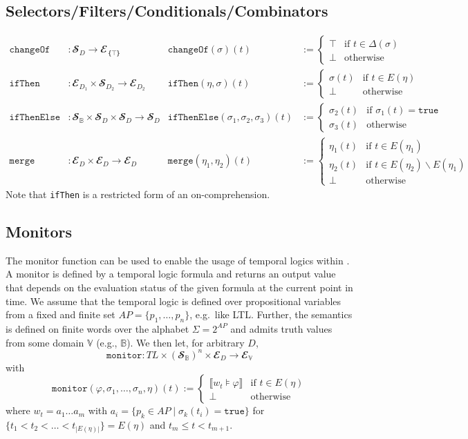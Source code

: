 \subsection{Selectors/Filters/Conditionals/Combinators}

\begin{align*}
  \mathtt{changeOf}&: 𝓢_{D} → 𝓔_{｛⊤｝}
      & \mathtt{changeOf}(σ)(t) &:= \begin{cases}
           ⊤ & \text{if } t∈Δ(σ)\\
           ⊥ & \text{otherwise}
         \end{cases}\\
  \mathtt{ifThen}&: 𝓔_{D_1} × 𝓢_{D_2} → 𝓔_{D_2}
      & \mathtt{ifThen}(η,σ)(t) &:= \begin{cases}
           σ(t) & \text{if } t∈E(η)\\
           ⊥ & \text{otherwise}
         \end{cases}\\
  \mathtt{ifThenElse}&: 𝓢_𝔹 × 𝓢_D × 𝓢_D → 𝓢_D
      & \mathtt{ifThenElse}(σ_1,σ_2,σ_3)(t) &:= \begin{cases}
           σ_2(t) & \text{if } σ_1(t) = \texttt{true}\\
           σ_3(t) & \text{otherwise}
         \end{cases}\\
  \mathtt{merge}&: 𝓔_D × 𝓔_D → 𝓔_D
      & \mathtt{merge}(η_1,η_2)(t) &:= \begin{cases}
           η_1(t) & \text{if } t∈E(η_1)\\
           η_2(t) & \text{if } t∈E(η_2)∖E(η_1)\\
           ⊥ & \text{otherwise}
         \end{cases}
\end{align*}
Note that \texttt{ifThen} is a restricted form of an on-comprehension.

\subsection{Monitors}

The monitor function can be used to enable the usage of temporal logics within \tessla. 
A monitor is defined by a temporal logic formula and returns an output value that depends on the evaluation status of the given formula at the current point in time.
We assume that the temporal logic is defined over propositional variables from a fixed and finite set $AP=\{p_1,…,p_n\}$, e.g.\ like LTL.
Further, the semantics is defined on finite words over the alphabet $Σ=2^{AP}$ and admits truth values from some domain $𝕍$ (e.g., $𝔹$).
We then let, for arbitrary $D$,
\[
  \texttt{monitor}: TL × (𝓢_𝔹)^n × 𝓔_D → 𝓔_𝕍
\]
with 
\[
  \texttt{monitor}(φ, σ_1,…,σ_n,η)(t) := \begin{cases}
    ⟦w_t⊧φ⟧ & \text{if } t∈E(η) \\
    ⊥ & \text{otherwise}
   \end{cases}
\]
where $w_t=a_1…a_{m}$ with $a_i=\{p_k∈AP \mid σ_k(t_i)=\texttt{true}\}$ for $\{t_1<t_2<…<t_{|E(η)|}\} = E(η)$ and $t_m≤t<t_{m+1}$.

